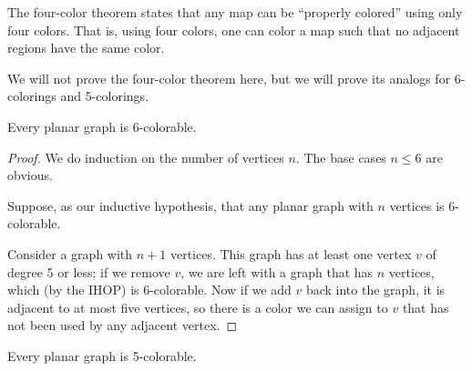 \documentclass[../m55main.tex]{chapters}
\begin{document}
The four-color theorem states that any map can be ``properly colored'' using only four colors.
That is, using four colors, one can color a map such that no adjacent regions have the same color.

We will not prove the four-color theorem here, but we will prove its analogs for 6-colorings and 5-colorings.

\begin{theorem}
    Every planar graph is 6-colorable.
\end{theorem}

\begin{proof}
    We do induction on the number of vertices $n$.
    The base cases $n \leq 6$ are obvious.

    Suppose, as our inductive hypothesis, that any planar graph with $n$ vertices is 6-colorable.

    Consider a graph with $n+1$ vertices.
    This graph has at least one vertex $v$ of degree 5 or less; if we remove $v$, we are left with a graph that has $n$ vertices, which (by the IHOP) is 6-colorable.
    Now if we add $v$ back into the graph, it is adjacent to at most five vertices, so there is a color we can assign to $v$ that has not been used by any adjacent vertex.
\end{proof}

\begin{theorem}
    Every planar graph is 5-colorable.
\end{theorem}
\end{document}
